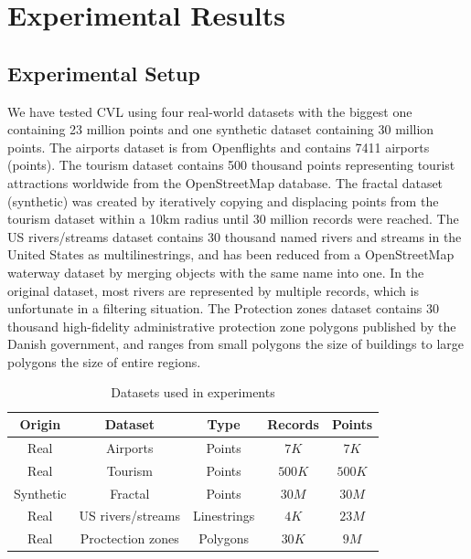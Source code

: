 \section{Experimental Results}
\label{sec:experimental}


\subsection{Experimental Setup}

We have tested CVL using four real-world datasets with the biggest one containing 23 million points and one synthetic dataset containing 30 million points. The airports dataset is from Openflights and contains 7411 airports (points). The tourism dataset contains 500 thousand points representing tourist attractions worldwide from the OpenStreetMap database. The fractal dataset (synthetic) was created by iteratively copying and displacing points from the tourism dataset within a 10km radius until 30 million records were reached. The US rivers/streams dataset contains 30 thousand named rivers and streams in the United States as multilinestrings, and has been reduced from a OpenStreetMap waterway dataset by merging objects with the same name into one. In the original dataset, most rivers are represented by multiple records, which is unfortunate in a filtering situation. The Protection zones dataset contains 30 thousand high-fidelity administrative protection zone polygons published by the Danish government, and ranges from small polygons the size of buildings to large polygons the size of entire regions.

\begin{table}[htdp]
\caption{Datasets used in experiments}
\begin{center}
\begin{tabular}{|c|c|c|c|c|}
\hline
\textbf{Origin} & \textbf{Dataset} & \textbf{Type} & \textbf{Records} & \textbf{Points} \\
\hline
Real & Airports & Points & $7K$ & $7K$ \\
Real & Tourism & Points & $500K$ & $500K$ \\
Synthetic & Fractal & Points & $30M$ & $30M$ \\
Real & US rivers/streams & Linestrings & $4K$ & $23M$ \\
Real & Proctection zones & Polygons & $30K$ & $9M$ \\
\hline
\end{tabular}
\end{center}
\label{default}
\end{table}%


